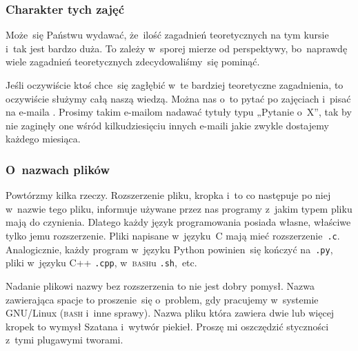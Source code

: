 \documentclass[10pt,t]{beamer}
\begin{document}
\begin{frame}
  \frametitle{Charakter tych zajęć}


  Może~się Państwu wydawać, że~ilość zagadnień teoretycznych na tym kursie
  i~tak jest bardzo duża. To zależy w~sporej mierze od perspektywy,
  bo~naprawdę wiele zagadnień teoretycznych zdecydowaliśmy~się pominąć.

  Jeśli oczywiście ktoś chce~się zagłębić w~te bardziej teoretyczne
  zagadnienia, to oczywiście służymy całą naszą wiedzą. Można
  nas o~to pytać po zajęciach i~pisać na e-maila \email.
  Prosimy takim e-mailom nadawać tytuły typu „Pytanie o~X”, tak by nie
  zaginęły one wśród kilkudziesięciu innych e-maili jakie zwykle dostajemy
  każdego miesiąca.

\end{frame}





\begin{frame}
  \frametitle{O~nazwach plików}


  Powtórzmy kilka rzeczy. Rozszerzenie pliku, kropka i~to co następuje po
  niej w~nazwie tego pliku, informuje używane przez nas programy z~jakim
  typem pliku mają do czynienia. Dlatego każdy język programowania posiada
  własne, właściwe tylko jemu rozszerzenie. Pliki napisane w~języku~C mają
  mieć rozszerzenie~\texttt{.c}. Analogicznie, każdy program w~języku Python
  powinien~się kończyć na~\texttt{.py}, pliki w~języku C++ \texttt{.cpp},
  w~\textsc{bash}u \texttt{.sh},~etc.

  Nadanie plikowi nazwy bez rozszerzenia to nie jest dobry pomysł. Nazwa
  zawierająca spacje to proszenie~się o~problem, gdy pracujemy w~systemie
  GNU/Linux (\textsc{bash} i~inne sprawy). Nazwa pliku która zawiera
  dwie lub więcej kropek to wymysł Szatana i~wytwór piekieł. Proszę mi
  oszczędzić styczności z~tymi plugawymi tworami.

\end{frame}
\end{document}
